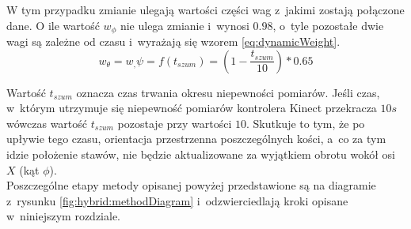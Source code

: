 W tym przypadku zmianie ulegają wartości części wag z~jakimi zostają połączone dane. O ile wartość $w_\phi$ nie ulega zmianie i~wynosi $0.98$, o~tyle pozostałe dwie wagi są zależne od czasu i~wyrażają się wzorem \ref{eq:dynamicWeight}.
\begin{equation}
	w_{\theta} = w_,\psi = f(t_{szum}) = (1-\frac{t_{szum}}{10}) * 0.65
	\label{eq:dynamicWeight}
\end{equation}

Wartość $t_{szum}$ oznacza czas trwania okresu niepewności pomiarów. Jeśli czas, w~którym utrzymuje się niepewność pomiarów kontrolera Kinect przekracza $10s$ wówczas wartość $t_{szum}$ pozostaje przy wartości $10$. Skutkuje to tym, że po upływie tego czasu, orientacja przestrzenna poszczególnych kości, a~co za tym idzie położenie stawów, nie będzie aktualizowane za wyjątkiem obrotu wokół osi $X$ (kąt $\phi$). \\


Poszczególne etapy metody opisanej powyżej przedstawione są na diagramie z~rysunku \ref{fig:hybrid:methodDiagram} i~odzwierciedlają kroki opisane w~niniejszym rozdziale.